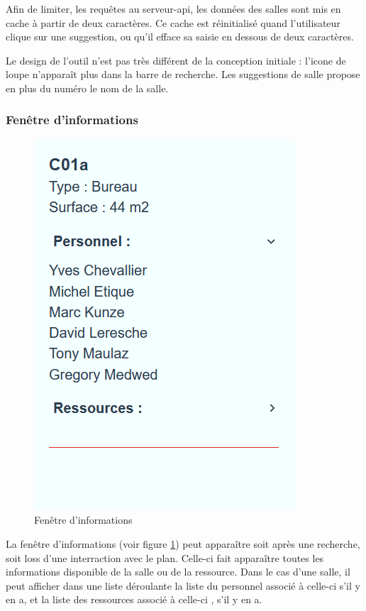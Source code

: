 \documentclass[
    iai, %
    il, %
]{heig-tb}
\begin{document}
Afin de limiter, les requêtes au serveur-api, les données des salles sont mis en cache à partir de deux caractères.
Ce cache est réinitialisé quand l'utilisateur clique sur une suggestion, ou qu'il efface sa saisie en dessous de deux caractères.

Le design de l'outil n'est pas très différent de la conception initiale : l'icone de loupe n'apparaît plus dans  la barre de recherche.
Les suggestions de salle propose en plus du numéro le nom de la salle.

\subsubsection{Fenêtre d'informations}

\begin{figure}[h]
    \centering
    \includegraphics[scale=0.5]{frontend-info.png}
    \caption{Fenêtre d'informations}
    \label{fig:info}
\end{figure}

La fenêtre d'informations (voir figure \ref{fig:info}) peut apparaître soit après une recherche, soit loss d'une interraction avec le plan.
Celle-ci fait apparaître toutes les informations disponible de la salle ou de la ressource.
Dans le cas d'une salle, il peut afficher dans une liste déroulante la liste du personnel associé à celle-ci s'il y en a,
et la liste des ressources associé à celle-ci , s'il y en a.
\end{document}
